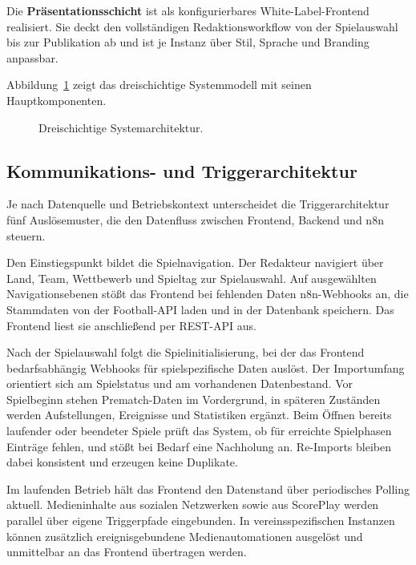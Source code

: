 Die \textbf{Präsentationsschicht} ist als konfigurierbares White-Label-Frontend realisiert. Sie deckt den vollständigen Redaktionsworkflow von der Spielauswahl bis zur Publikation ab und ist je Instanz über Stil, Sprache und Branding anpassbar.

Abbildung~\ref{fig:systemarchitektur} zeigt das dreischichtige Systemmodell mit seinen Hauptkomponenten.

\begin{figure}[H]
\centering
\DiagramSystemArchitektur
\caption[Dreischichtige Systemarchitektur des Liveticker-Systems]{Dreischichtige Systemarchitektur.}
\label{fig:systemarchitektur}
\end{figure}



\subsection{Kommunikations- und
Triggerarchitektur}\label{kommunikations--und-triggerarchitektur}

Je nach Datenquelle und Betriebskontext unterscheidet die Triggerarchitektur fünf Auslösemuster, die den Datenfluss zwischen Frontend, Backend und n8n steuern.

Den Einstiegspunkt bildet die Spielnavigation. Der Redakteur navigiert über Land, Team, Wettbewerb und Spieltag zur Spielauswahl. Auf ausgewählten Navigationsebenen stößt das Frontend bei fehlenden Daten n8n-Webhooks an, die Stammdaten von der Football-API laden und in der Datenbank speichern. Das Frontend liest sie anschließend per REST-API aus.

Nach der Spielauswahl folgt die Spielinitialisierung, bei der das Frontend bedarfsabhängig Webhooks für spielspezifische Daten auslöst. Der Importumfang orientiert sich am Spielstatus und am vorhandenen Datenbestand. Vor Spielbeginn stehen Prematch-Daten im Vordergrund, in späteren Zuständen werden Aufstellungen, Ereignisse und Statistiken ergänzt. Beim Öffnen bereits laufender oder beendeter Spiele prüft das System, ob für erreichte Spielphasen Einträge fehlen, und stößt bei Bedarf eine Nachholung an. Re-Imports bleiben dabei konsistent und erzeugen keine Duplikate.

Im laufenden Betrieb hält das Frontend den Datenstand über periodisches Polling aktuell. Medieninhalte aus sozialen Netzwerken sowie aus ScorePlay werden parallel über eigene Triggerpfade eingebunden. In vereinsspezifischen Instanzen können zusätzlich ereignisgebundene Medienautomationen ausgelöst und unmittelbar an das Frontend übertragen werden.

